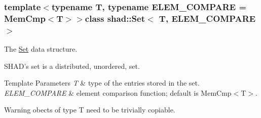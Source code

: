\subsubsection*{template$<$typename T, typename E\-L\-E\-M\-\_\-\-C\-O\-M\-P\-A\-R\-E = Mem\-Cmp$<$\-T$>$$>$class shad\-::\-Set$<$ T, E\-L\-E\-M\-\_\-\-C\-O\-M\-P\-A\-R\-E $>$}

The \hyperlink{classshad_1_1Set}{Set} data structure. 

S\-H\-A\-D's set is a distributed, unordered, set. 
\begin{DoxyTemplParams}{Template Parameters}
{\em T} & type of the entries stored in the set. \\
\hline
{\em E\-L\-E\-M\-\_\-\-C\-O\-M\-P\-A\-R\-E} & element comparison function; default is Mem\-Cmp$<$\-T$>$. \\
\hline
\end{DoxyTemplParams}
\begin{DoxyWarning}{Warning}
obects of type T need to be trivially copiable. 
\end{DoxyWarning}


